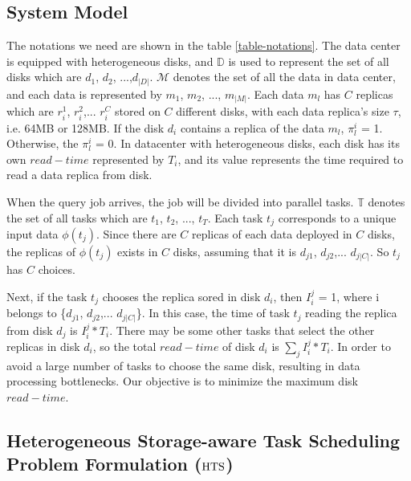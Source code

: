 \documentclass[conference]{IEEEtran}
\begin{document}
\subsection{System Model}

The notations we need are shown in the table \ref{table-notations}. The data center is equipped with heterogeneous disks, and $\mathbb{D}$ is used to represent the set of all disks which are $d_{1}$, $d_{2}$, ...,$d_{|D|}$.  $\mathcal{M}$ denotes the set of all the data in data center, and each data is represented by $m_{1}$, $m_{2}$, ..., $m_{|M|}$. Each data $m_{l}$ has $C$ replicas which are $r_i^1$, $r_i^2$,... $r_i^{C}$ stored on $C$ different disks, with each data replica's size $\tau$, i.e. 64MB or 128MB. If the disk $d_{i}$ contains a replica of the data $m_l$, $\pi_l^{i}$ = 1. Otherwise, the $\pi_l^{i}$ = 0. In datacenter with heterogeneous disks, each disk has its own $read-time$ represented by $T_i$, and its value represents the time required to read a data replica from disk.

When the query job arrives, the job will be divided into parallel tasks. $\mathbb{T}$ denotes the set of all tasks which are $t_1$, $t_2$, ..., $t_{T}$. Each task $t_j$ corresponds to a unique input data $\phi(t_j)$. Since there are $C$ replicas of each data deployed in $C$ disks, the replicas of $\phi(t_j)$ exists in $C$ disks, assuming that it is $d_{j1}$, $d_{j2}$,... $d_{j|C|}$. So $t_j$ has $C$ choices.

Next, if the task $t_j$ chooses the replica sored in disk $d_i$, then $I_i^j$ = 1, where i belongs to \{$d_{j1}$, $d_{j2}$,... $d_{j|C|}$\}. In this case, the time of task $t_j$ reading the replica from disk $d_{j}$ is $I_i^j*T_i$. There may be some other tasks that select the other replicas in disk $d_{i}$, so the total $read-time$ of disk $d_{i}$ is $\sum_{j}I_i^j*T_i$. In order to avoid a large number of tasks to choose the same disk, resulting in data processing bottlenecks. Our objective is to minimize the maximum disk $read-time$.

\subsection{Heterogeneous Storage-aware Task Scheduling Problem Formulation ($\rm{HTS}$)} \label{HTS}

\end{document}
